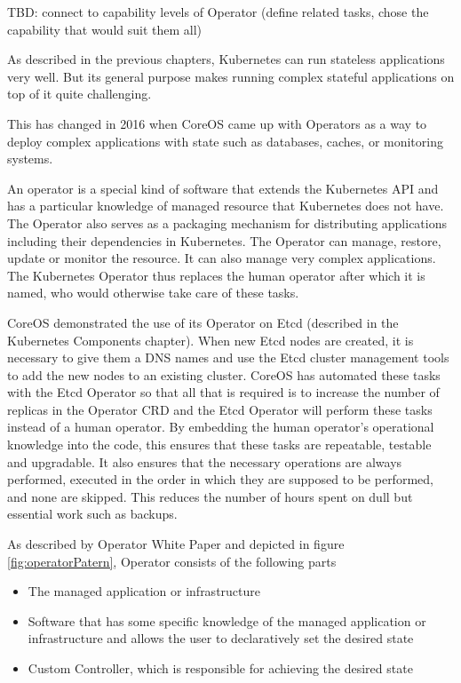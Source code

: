 TBD: connect to capability levels of Operator (define related tasks, chose the capability that would suit them all)

\pagebreak
{}
As described in the previous chapters, Kubernetes can run stateless applications very well. But its general purpose makes running complex stateful applications on top of it quite challenging.


This has changed in 2016 when CoreOS came up with Operators as a way to deploy complex applications with state such as databases, caches, or monitoring systems. \cite{IArchiveCOSOperators}

An operator is a special kind of software that extends the Kubernetes API and has a particular knowledge of managed resource that Kubernetes does not have. The Operator also serves as a packaging mechanism for distributing applications including their dependencies in Kubernetes. The Operator can manage, restore, update or monitor the resource. It can also manage very complex applications. The Kubernetes Operator thus replaces the human operator after which it is named, who would otherwise take care of these tasks. \cite{OperatorsPreface} \cite{IArchiveCOSOperators}


CoreOS demonstrated the use of its Operator on Etcd (described in the Kubernetes Components chapter). When new Etcd nodes are created, it is necessary to give them a DNS names and use the Etcd cluster management tools to add the new nodes to an existing cluster. CoreOS has automated these tasks with the Etcd Operator so that all that is required is to increase the number of replicas in the Operator CRD and the Etcd Operator will perform these tasks instead of a human operator. \cite{IArchiveCOSOperators}
By embedding the human operator's operational knowledge into the code, this ensures that these tasks are repeatable, testable and upgradable. It also ensures that the necessary operations are always performed, executed in the order in which they are supposed to be performed, and none are skipped. This reduces the number of hours spent on dull but essential work such as backups. \cite{OperatorWhitepaper}

As described by Operator White Paper \cite{OperatorWhitepaper} and depicted in figure \ref{fig:operatorPatern}, Operator consists of the following parts
\begin{itemize}
  \item The managed application or infrastructure
  \item Software that has some specific knowledge of the managed application or infrastructure and allows the user to declaratively set the desired state
  \item Custom Controller, which is responsible for achieving the desired state
\end{itemize}

